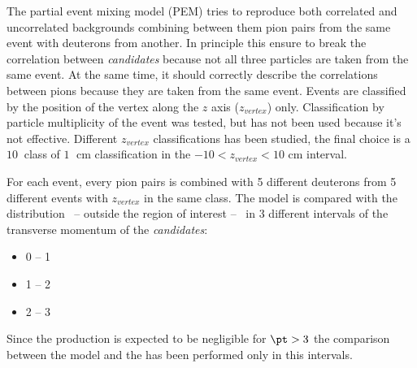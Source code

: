 The partial event mixing model (PEM) tries to reproduce both correlated and uncorrelated backgrounds
combining between them pion pairs from the same event with deuterons from another.
In principle this ensure to break the correlation between \textit{\ds candidates} because not all three
particles are taken from the same event.
At the same time, it should correctly describe the correlations between pions because they are taken from the 
same event.
Events are classified by the position of the vertex along the $z$ axis ($z_{vertex}$) only. Classification 
by particle multiplicity of the event was tested, but has not been used because it’s not effective.
Different $z_{vertex}$ classifications has been studied, the final choice is a $10\ $ class of $1\;$ cm
classification in the $-10 < z_{vertex} < 10$ cm interval.

For each event, every pion pairs is combined with 5 different deuterons from 5 different events
with $z_{vertex}$ in the same class.
The model is compared with the \minv distribution \ -- outside the region of interest -- \ in 3
different intervals of the transverse momentum of the \textit{\ds candidates}:
\begin{itemize}
    \item 0 -- 1 \ \gevc
    \item 1 -- 2 \ \gevc
    \item 2 -- 3 \ \gevc
\end{itemize}
Since the \ds production is expected to be negligible for $\pt > 3$ \gevc the comparison between the
model and the \minv has been performed only in this intervals.

